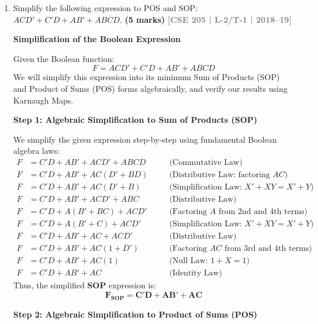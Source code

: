\documentclass[12pt,a3paper]{article}
\newcommand{\yr}[1]{\hfill\textcolor{gray}{\small\textbf{[#1]}}}
\newcommand{\mk}[1]{\textcolor{orange!70!black}{\small\textbf{(#1 marks)}}}
\begin{document}
\begin{enumerate}
\item Simplify the following expression to POS and SOP: $ACD' + C'D + AB' + ABCD$.
\mk{5} \yr{CSE 205 | L-2/T-1 | 2018--19}

\begin{tcolorbox}[enhanced,breakable,ansbox,colback=cA!4,colframe=cA,boxrule=0.8pt,arc=5pt,title={\textbf{Answer}},fonttitle=\bfseries\color{white},colbacktitle=cA]

\textbf{Simplification of the Boolean Expression}

Given the Boolean function:
\[ F = ACD' + C'D + AB' + ABCD \]
We will simplify this expression into its minimum Sum of Products (SOP) and Product of Sums (POS) forms algebraically, and verify our results using Karnaugh Maps.

\vspace{0.3cm}
\textbf{Step 1: Algebraic Simplification to Sum of Products (SOP)}

We simplify the given expression step-by-step using fundamental Boolean algebra laws:
\begin{align*}
F &= C'D + AB' + ACD' + ABCD \quad &&\text{(Commutative Law)} \\
F &= C'D + AB' + AC(D' + BD) \quad &&\text{(Distributive Law: factoring } AC \text{)} \\
F &= C'D + AB' + AC(D' + B) \quad &&\text{(Simplification Law: } X' + XY = X' + Y \text{)} \\
F &= C'D + AB' + ACD' + ABC \quad &&\text{(Distributive Law)} \\
F &= C'D + A(B' + BC) + ACD' \quad &&\text{(Factoring } A \text{ from 2nd and 4th terms)} \\
F &= C'D + A(B' + C) + ACD' \quad &&\text{(Simplification Law: } X' + XY = X' + Y \text{)} \\
F &= C'D + AB' + AC + ACD' \quad &&\text{(Distributive Law)} \\
F &= C'D + AB' + AC(1 + D') \quad &&\text{(Factoring } AC \text{ from 3rd and 4th terms)} \\
F &= C'D + AB' + AC(1) \quad &&\text{(Null Law: } 1 + X = 1 \text{)} \\
F &= C'D + AB' + AC \quad &&\text{(Identity Law)}
\end{align*}
Thus, the simplified \textbf{SOP} expression is:
\[ \mathbf{F_{SOP} = C'D + AB' + AC} \]

\vspace{0.3cm}
\textbf{Step 2: Algebraic Simplification to Product of Sums (POS)}


\end{tcolorbox}
\end{enumerate}
\end{document}
